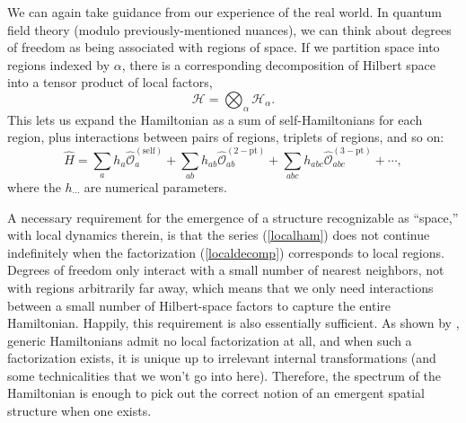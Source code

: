 \documentclass[12pt,english]{article}
\newcommand{\be}{\begin{equation}}
\newcommand{\ee}{\end{equation}}
\newcommand{\HH}{\mathcal{H}}
\begin{document}
We can again take guidance from our experience of the real world.
In quantum field theory (modulo previously-mentioned nuances), we can think about degrees of freedom as being associated with regions of space.
If we partition space into regions indexed by $\alpha$, there is a corresponding decomposition of Hilbert space into a tensor product of local factors,
\be
  \HH = \bigotimes_\alpha \HH_\alpha.
  \label{localdecomp}
\ee
This lets us expand the Hamiltonian as a sum of self-Hamiltonians for each region, plus interactions between pairs of regions, triplets of regions, and so on:
\be
  \hat{H} = \sum_a h_a\hat{\mathcal{O}}_a^{\mathrm{(self)}} + \sum_{ab} h_{ab}\hat{\mathcal{O}}_{ab}^{\mathrm{(2-pt)}} + \sum_{abc} h_{abc}\hat{\mathcal{O}}_{abc}^{\mathrm{(3-pt)}} + \cdots,
  \label{localham}
\ee
where the $h_{\cdots}$ are numerical parameters.

A necessary requirement for the emergence of a structure recognizable as ``space,'' with local dynamics therein, is that the series (\ref{localham}) does not continue indefinitely when the factorization (\ref{localdecomp}) corresponds to local regions.
Degrees of freedom only interact with a small number of nearest neighbors, not with regions arbitrarily far away, which means that we only need interactions between a small number of Hilbert-space factors to capture the entire Hamiltonian.
Happily, this requirement is also essentially sufficient.
As shown by \citet{Cotler:2017abq}, generic Hamiltonians admit no local factorization at all, and when such a factorization exists, it is unique up to irrelevant internal transformations (and some technicalities that we won't go into here).
Therefore, the spectrum of the Hamiltonian is enough to pick out the correct notion of an emergent spatial structure when one exists.
\end{document}
